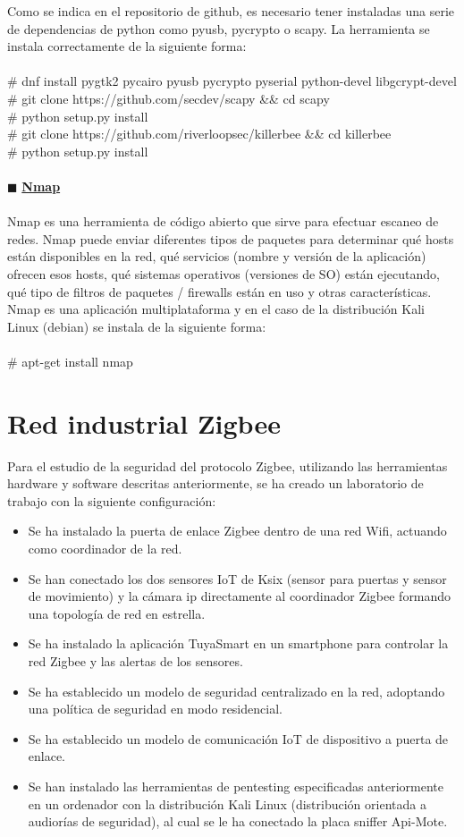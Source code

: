\clearpage
Como se indica en el repositorio de github, es necesario tener instaladas una serie de dependencias de python como pyusb, pycrypto o scapy. La herramienta se instala correctamente de la siguiente forma:
\\\\\# dnf install pygtk2 pycairo pyusb pycrypto pyserial python-devel libgcrypt-devel
\\\# git clone https://github.com/secdev/scapy \&\& cd scapy
\\\# python setup.py install
\\\# git clone https://github.com/riverloopsec/killerbee \&\& cd killerbee
\\\# python setup.py install
\\\\$\blacksquare$ {\underline{\textbf{Nmap}}}
\\\\Nmap es una herramienta de código abierto que sirve para efectuar escaneo de redes. Nmap puede enviar diferentes tipos de paquetes para determinar qué hosts están disponibles en la red, qué servicios (nombre y versión de la aplicación) ofrecen esos hosts, qué sistemas operativos (versiones de SO) están ejecutando, qué tipo de filtros de paquetes / firewalls están en uso y otras características. Nmap es una aplicación multiplataforma y en el caso de la distribución Kali Linux (debian) se instala de la siguiente forma:
\\\\\# apt-get install nmap
\section{Red industrial Zigbee} %
Para el estudio de la seguridad del protocolo Zigbee, utilizando las herramientas hardware y software descritas anteriormente, se ha creado un laboratorio de trabajo con la siguiente configuración:
\begin{itemize}
\item Se ha instalado la puerta de enlace Zigbee dentro de una red Wifi, actuando como coordinador de la red.
\item Se han conectado los dos sensores IoT de Ksix (sensor para puertas y sensor de movimiento) y la cámara ip directamente al coordinador Zigbee formando una topología de red en estrella.
\item Se ha instalado la aplicación TuyaSmart en un smartphone para controlar la red Zigbee y las alertas de los sensores.
\item Se ha establecido un modelo de seguridad centralizado en la red, adoptando una política de seguridad en modo residencial.
\item Se ha establecido un modelo de comunicación IoT de dispositivo a puerta de enlace.
\item Se han instalado las herramientas de pentesting especificadas anteriormente en un ordenador con la distribución Kali Linux (distribución orientada a audiorías de seguridad), al cual se le ha conectado la placa sniffer Api-Mote.
\end{itemize}
\clearpage